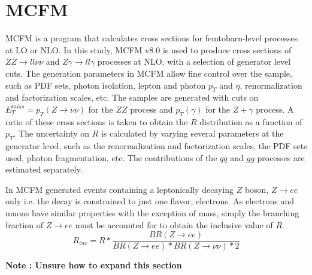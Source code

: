 \documentclass[11pt,a4paper,openright,twoside]{report}
\newcommand{\ZZ}{$ZZ\to ll\nu\nu$ }
\newcommand{\Zg}{$Z\gamma\to ll\gamma$ }
\begin{document}
\section{MCFM}
MCFM is a program that calculates cross sections for femtobarn-level processes at LO or NLO. In this study, MCFM v8.0 \cite{MCFM} is used to produce cross sections of \ZZ and \Zg processes at NLO, with a selection of generator level cuts. The generation parameters in MCFM allow fine control over the sample, such as PDF sets, photon isolation, lepton and photon $p_T$ and $\eta$, renormalization and factorization scales, etc. The samples are generated with cuts on $E_T^{miss} = p_T(Z\to \nu\nu)$ for the $ZZ$ process and $p_T(\gamma)$ for the $Z+\gamma$ process. A ratio of these cross sections is taken to obtain the $R$ distribution as a function of $p_T$. The uncertainty on $R$ is calculated by varying several parameters at the generator level, such as the renormalization and factorization scales, the PDF sets used, photon fragmentation, etc. The contributions of the $q \bar{q}$ and $gg$ processes are estimated separately.

In MCFM generated events containing a leptonically decaying $Z$ boson, $Z\rightarrow ee$ only i.e. the decay is constrained to just one flavor, electrons. As electrons and muons have similar properties with the exception of mass, simply the branching fraction of $Z\rightarrow ee$ must be accounted for to obtain the inclusive value of $R$.
\begin{equation}\label{eq:R_inc}
	R_{inc} = R * \frac{BR(Z\rightarrow ee)}{BR(Z \rightarrow ee)*BR(Z\rightarrow \nu\nu)*2}
\end{equation}

\noindent\textbf{Note : Unsure how to expand this section}
\end{document}
